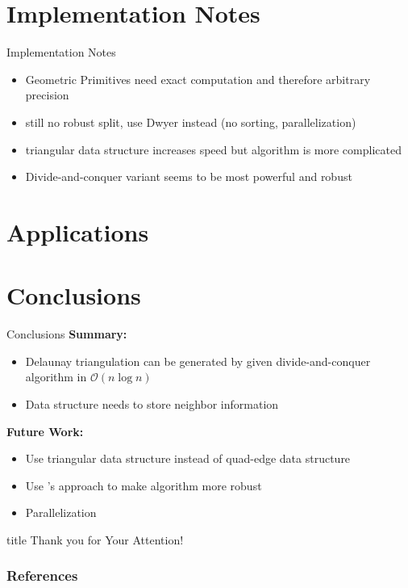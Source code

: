 \documentclass[aspectratio=169,fleqn]{beamer}
\begin{document}
\section{Implementation Notes}
  \begin{frame}{Implementation Notes}
    \begin{itemize}
      \item Geometric Primitives need exact computation and therefore arbitrary precision
      \item still no robust split, use Dwyer instead (no sorting, parallelization)
      \item triangular data structure increases speed but algorithm is more complicated
      \item Divide-and-conquer variant seems to be most powerful and robust
    \end{itemize}
  \end{frame}

\section{Applications}

\section{Conclusions}
  \begin{frame}{Conclusions}
    \textbf{Summary:}
    \begin{itemize}
      \item Delaunay triangulation can be generated by given divide-and-conquer algorithm in $\mathscr{O}(n\log n)$
      \item Data structure needs to store neighbor information
    \end{itemize}
    \bigskip
    \textbf{Future Work:}
    \begin{itemize}
      \item Use triangular data structure instead of quad-edge data structure
      \item Use \citeauthor{dwyer1987}'s approach to make algorithm more robust
      \item Parallelization
    \end{itemize}
  \end{frame}


\setcounter{backupcounter}{\value{framenumber}}

\begin{frame}[plain]
  \vfill
  \centering
  \begin{beamercolorbox}[sep=8pt,center,shadow=true,rounded=true]{title}
    Thank you for Your Attention!%
    \par%
  \end{beamercolorbox}
  \vfill
\end{frame}

\begin{frame}[plain]
  \frametitle{References}
  \AtNextBibliography{\tiny}
  \begin{multicols}{2}
    \nocite{*}
    \printbibliography
  \end{multicols}
\end{frame}

\setcounter{framenumber}{\value{backupcounter}}
\end{document}
